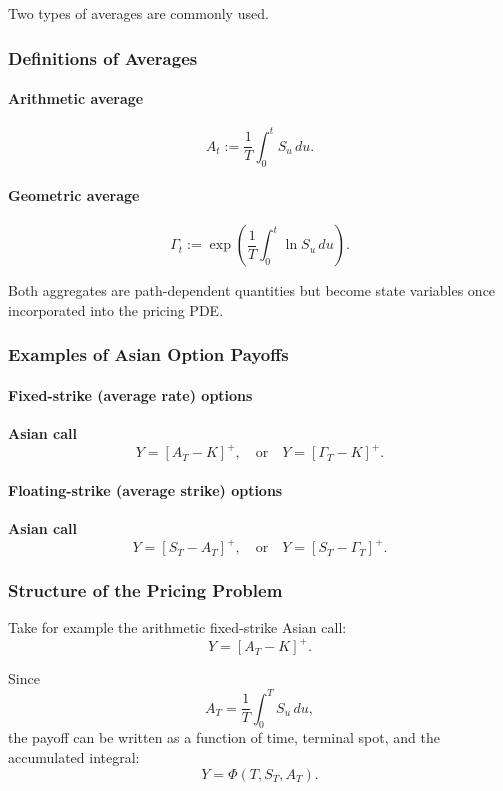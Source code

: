 \documentclass[12pt,a4paper]{article}
\theoremstyle{definition}
\begin{document}
Two types of averages are commonly used.

\subsubsection{Definitions of Averages}

\paragraph{Arithmetic average}
\[
A_t := \frac{1}{T} \int_0^t S_u\, du.
\]

\paragraph{Geometric average}
\[
\Gamma_t := \exp\!\left(\frac{1}{T} \int_0^t \ln S_u\, du\right).
\]

Both aggregates are path-dependent quantities but become state variables once incorporated into the pricing PDE.

\subsubsection{Examples of Asian Option Payoffs}

\paragraph{Fixed-strike (average rate) options}

\textbf{Asian call}
\[
Y = [A_T - K]^+, \quad \text{or} \quad Y = [\Gamma_T - K]^+.
\]

\paragraph{Floating-strike (average strike) options}

\textbf{Asian call}
\[
Y = [S_T - A_T]^+, \quad \text{or} \quad Y = [S_T - \Gamma_T]^+.
\]

\subsubsection{Structure of the Pricing Problem}

Take for example the arithmetic fixed-strike Asian call:
\[
Y = [A_T - K]^+.
\]

Since
\[
A_T = \frac{1}{T} \int_0^T S_u\, du,
\]
the payoff can be written as a function of time, terminal spot, and the accumulated integral:
\[
Y = \Phi(T, S_T, A_T).
\]
\end{document}
